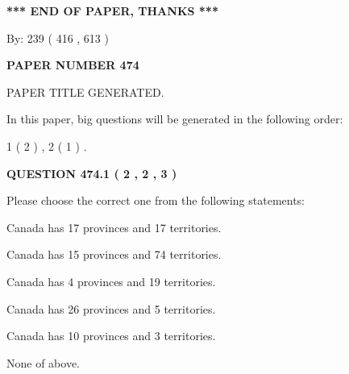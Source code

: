 \documentclass[12pt]{article}
\begin{document}
   
\vspace{1.0in} 
{\textbf{\large{ *** END OF PAPER, THANKS *** }}} 
   
   
\hspace{1.0in} By: 
 239 ( 416 ,  613 )
   
   
   
   
\newpage 
\setcounter{page}{ 
   474001 } 
   
   
   
   
 {\textbf{ \Large{ PAPER NUMBER  474  }}}
   
   
\vspace{0.2in}
   
   
   
   
   
   
   
   
 \vspace{0.2in}
 
 
 
 
   
   
 PAPER TITLE GENERATED.
   
   
   
\vspace{0.2in}
   
In this paper, big questions will be generated in the following order: 
   
   
   1 ( 2 )
 ,
   2 ( 1 )
 .
  
\vspace{0.2in}
  
{\textbf{\Large{QUESTION
474.1 
 ( 2 , 2 , 3 )
}}}
  
  
Please choose the correct one from the following statements:
 
 
Canada has  17 provinces and  17 territories.
 
 
Canada has  15 provinces and  74 territories.
 
 
Canada has   4 provinces and  19 territories.
 
 
Canada has  26 provinces and  5 territories.
 
 
Canada has 10  provinces and 3 territories.
 
 
 None of above.
 
 
\noindent{}
 
\end{document}
